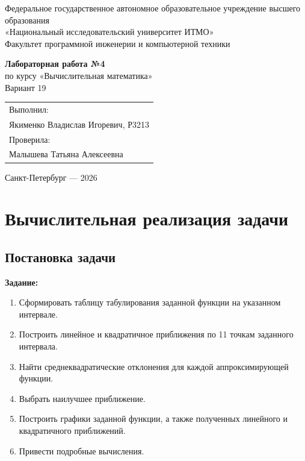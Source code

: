 \documentclass[12pt,a4paper]{article}
\begin{document}
\hypersetup{pageanchor=false}
\begin{titlepage}
  \thispagestyle{empty}
  \begin{center}
    {\small Федеральное государственное автономное образовательное учреждение высшего образования\\
    «Национальный исследовательский университет ИТМО»}\\[0.8em]
    {\small Факультет программной инженерии и компьютерной техники}

    \vfill

    {\Large\textbf{Лабораторная работа №4}}\\[0.6em]
    {\large по курсу «Вычислительная математика»}\\[0.6em]
    {\large Вариант 19}

    \vfill

    \begin{flushright}
      \begin{tabular}{l}
        Выполнил:\\
        Якименко Владислав Игоревич, Р3213\\[0.8em]
        Проверила:\\
        Малышева Татьяна Алексеевна
      \end{tabular}
    \end{flushright}

    \vfill

    Санкт-Петербург --- 2026
  \end{center}
\end{titlepage}
\clearpage
\hypersetup{pageanchor=true}

\tableofcontents
\thispagestyle{empty}
\clearpage
{}

\section{Вычислительная реализация задачи}

\subsection{Постановка задачи}

\textbf{Задание:}
\begin{enumerate}[label=\arabic*., leftmargin=1.2cm]
  \item Сформировать таблицу табулирования заданной функции на указанном интервале.
  \item Построить линейное и квадратичное приближения по 11 точкам заданного интервала.
  \item Найти среднеквадратические отклонения для каждой аппроксимирующей функции.
  \item Выбрать наилучшее приближение.
  \item Построить графики заданной функции, а также полученных линейного и квадратичного приближений.
  \item Привести подробные вычисления.
\end{enumerate}
\end{document}
